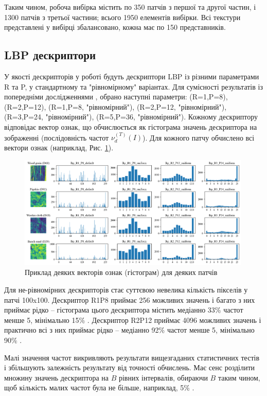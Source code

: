 Таким чином, робоча вибірка містить по 350 патчів з першої та другої частин, і 1300 патчів з третьої частини; всього 1950 елементів вибірки.
Всі текстури представлені у вибірці збалансовано, кожна має по 150 представників.

\subsection{LBP дескриптори}\label{section2.1b}

У якості дескрипторів у роботі будуть дескриптори LBP із різними параметрами R та P, у стандартному та "рівномірному" варіантах.
Для сумісності результатів із попередніми дослідженнями \cite{ojala2002,fastlbp2024}, обрано наступні параметри:
(R=1,P=8), (R=2,P=12), (R=1,P=8, "рівномірний"), (R=2,P=12, "рівномірний"), (R=3,P=24, "рівномірний"), (R=5,P=36, "рівномірний").
Кожному дескриптору відповідає вектор ознак, що обчислюється як гістограма значень дескриптора на зображенні (послідовність частот $\nu^{(T)}_d(I)$).
Для кожного патчу обчислено всі вектори ознак (наприклад, Рис. \ref{fig:example-features}).

\begin{figure}[h]
    \centering
    \includegraphics[width=0.99\textwidth]{img/example_features.png}
    \caption{
        Приклад деяких векторів ознак (гістограм) для деяких патчів
    }
    \label{fig:example-features}
\end{figure}

Для не-рівномірних дескрипторів стає суттєвою невелика кількість пікселів у патчі 100x100.
Дескриптор R1P8 приймає 256 можливих значень і багато з них приймає рідко -- гістограма цього дескриптора містить медіанно 33\% частот менше 5, мінімально 15\% .
Дескриптор R2P12 приймає 4096 можливих значень і практично всі з них приймає рідко -- медіанно 92\% частот менше 5, мінімально 90\% .

Малі значення частот викривляють результати вищезгаданих статистичних тестів і збільшують залежність результату від точності обчислень.
Має сенс розділити множину значень дескриптора на $B$ рівних інтервалів, обираючи $B$ таким чином, щоб кількість малих частот була не більше, наприклад, 5\% \cite{ojala2002}.

